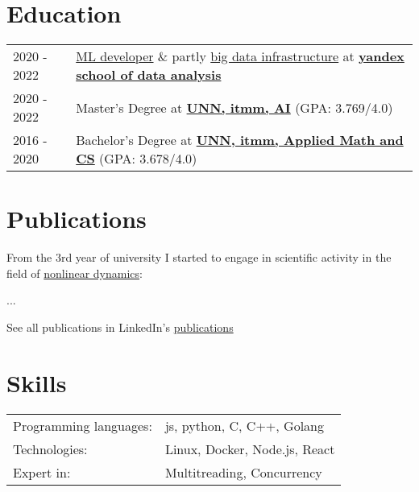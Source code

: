 \documentclass[a4paper,12pt]{article}
\begin{document}
\section{Education}
\begin{tabularx}{\linewidth}{@{}l X@{}}	
2020 - 2022 & \href{https://academy.yandex.com/dataschool/course/machine-learning}{ML developer} \& partly \href{https://academy.yandex.com/dataschool/course/big-data-infrastructure}{big data infrastructure} at \textbf{\href{https://academy.yandex.com/dataschool/}{yandex school of data analysis}} \\
2020 - 2022 & Master's Degree at \textbf{\href{https://shorturl.at/dlpt5}{UNN, itmm, AI}} \hfill \normalsize (GPA: 3.769/4.0) \\
2016 - 2020 & Bachelor's Degree at \textbf{\href{https://shorturl.at/HJKYZ}{UNN, itmm, Applied Math and CS}} \hfill (GPA: 3.678/4.0) \\

\end{tabularx}

\section{Publications}

From the 3rd year of university I started to engage in scientific activity in the field of \href{https://www.wikiwand.com/en/Nonlinear_system}{nonlinear dynamics}:

\begin{refsection}
\nocite{*}
\printbibliography[heading=none]
\end{refsection}

...

See all publications in LinkedIn's \href{https://www.linkedin.com/in/dmitry-khorkin/details/publications/}{publications}

\section{Skills}
\begin{tabularx}{\linewidth}{@{}l X@{}}
Programming languages: & \normalsize{js, python, C, C++, Golang} \\
Technologies: & \normalsize{Linux, Docker, Node.js, React} \\
Expert in: & \normalsize{Multitreading, Concurrency} \\
\end{tabularx}

\vfill
{}
 
\end{document}
